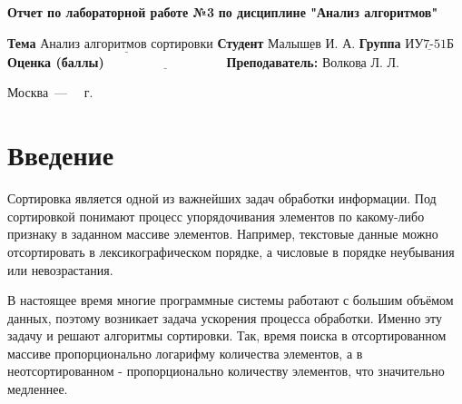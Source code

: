 \documentclass[12pt]{report}
\begin{document}
\begin{titlepage}
	
	\begin{center}
		\noindent\begin{minipage}{1.3\textwidth}\centering
			\Large\textbf{  Отчет по лабораторной работе №3}\newline
			\textbf{по дисциплине "Анализ алгоритмов"}\newline\newline
		\end{minipage}
	\end{center}
	
	\noindent\textbf{Тема} $\underline{\text{Анализ алгоритмов сортировки}}$\newline\newline
	\noindent\textbf{Студент} $\underline{\text{Малышев И. А.}}$\newline\newline
	\noindent\textbf{Группа} $\underline{\text{ИУ7-51Б}}$\newline\newline
	\noindent\textbf{Оценка (баллы)} $\underline{\text{~~~~~~~~~~~~~~~~~~~~~~~~~~~}}$\newline\newline
	\noindent\textbf{Преподаватель: } $\underline{\text{Волкова Л. Л.}}$\newline\newline\newline
	
	\begin{center}
		\vfill
		Москва~---~\the\year
		~г.
	\end{center}
\end{titlepage}


\renewcommand{\contentsname}{Содержание}
\tableofcontents
  
\newpage
\chapter*{Введение}


Сортировка является одной из важнейших задач обработки информации. Под сортировкой понимают процесс упорядочивания элементов по какому-либо признаку в заданном массиве элементов. Например, текстовые данные можно отсортировать в лексикографическом порядке, а числовые в порядке неубывания или невозрастания.

В настоящее время многие программные системы работают с большим объёмом данных, поэтому возникает задача ускорения процесса обработки. Именно эту задачу и решают алгоритмы сортировки. Так, время поиска в отсортированном массиве пропорционально логарифму количества элементов, а в неотсортированном - пропорционально количеству элементов, что значительно медленнее.
\end{document}
